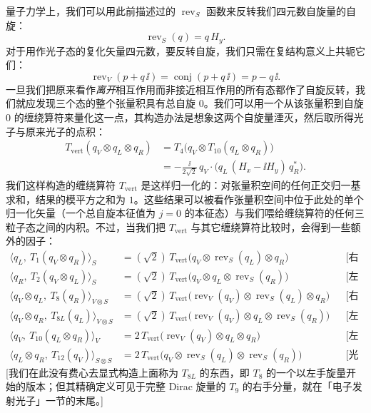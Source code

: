 量子力学上，我们可以用此前描述过的 $\operatorname{rev}_S$ 函数来反转我们四元数自旋量的自旋：
\begin{equation*}
\operatorname{rev}_S(q)=q\,H_y .
\end{equation*}
对于用作光子态的复化矢量四元数，要反转自旋，我们只需在复结构意义上共轭它们：
\begin{equation*}
\operatorname{rev}_V(p+q\,\ii)=\operatorname{conj}(p+q\,\ii)=p-q\,\ii .
\end{equation*}
一旦我们把原来看作\emph{离开}相互作用而非接近相互作用的所有态都作了自旋反转，我们就应发现三个态的整个张量积具有总自旋 $0$。我们可以用一个从该张量积到自旋 0 的缠绕算符来量化这一点，其构造办法是想象这两个自旋量湮灭，然后取所得光子与原来光子的点积：
\begin{align*}
T_{\mathrm{vert}}(q_V\otimes q_L\otimes q_R)
&= T_4\bigl(q_V\otimes T_{10}(q_L\otimes q_R)\bigr)\\
&= -\frac{\ii}{2\sqrt2}\,q_V\cdot\bigl(q_L\,(H_x-\ii H_y)\,q_R^*\bigr).
\end{align*}
我们这样构造的缠绕算符 $T_{\mathrm{vert}}$ 是这样归一化的：对张量积空间的任何正交归一基求和，结果的模平方之和为 $1$。这些结果可以被看作张量积空间中位于此处的单个归一化矢量（一个总自旋本征值为 $j=0$ 的本征态）与我们喂给缠绕算符的任何三粒子态之间的内积。不过，当我们把 $T_{\mathrm{vert}}$ 与其它缠绕算符比较时，会得到一些额外的因子：
\begin{align*}
\langle q_L,\ T_1(q_V\otimes q_R)\rangle_S
&= (\sqrt2)\,T_{\mathrm{vert}}\bigl(q_V\otimes\operatorname{rev}_S(q_L)\otimes q_R\bigr)
&&\text{[右手旋量吸收光子变成左手旋量]}\\
\langle q_R,\ T_2(q_V\otimes q_L)\rangle_S
&= (\sqrt2)\,T_{\mathrm{vert}}\bigl(q_V\otimes q_L\otimes\operatorname{rev}_S(q_R)\bigr)
&&\text{[左手旋量吸收光子变成右手旋量]}\\
\langle q_V\otimes q_L,\ T_8(q_R)\rangle_{V\otimes S}
&= (\sqrt2)\,T_{\mathrm{vert}}\bigl(\operatorname{rev}_V(q_V)\otimes\operatorname{rev}_S(q_L)\otimes q_R\bigr)
&&\text{[右手旋量发射光子变成左手旋量]}\\
\langle q_V\otimes q_R,\ T_{8L}(q_L)\rangle_{V\otimes S}
&= (\sqrt2)\,T_{\mathrm{vert}}\bigl(\operatorname{rev}_V(q_V)\otimes q_L\otimes\operatorname{rev}_S(q_R)\bigr)
&&\text{[左手旋量发射光子变成右手旋量]}\\
\langle q_V,\ T_{10}(q_L\otimes q_R)\rangle_V
&= 2\,T_{\mathrm{vert}}\bigl(\operatorname{rev}_V(q_V)\otimes q_L\otimes q_R\bigr)
&&\text{[左手与右手旋量湮灭产生光子]}\\
\langle q_L\otimes q_R,\ T_{12}(q_V)\rangle_{S\otimes S}
&= 2\,T_{\mathrm{vert}}\bigl(q_V\otimes\operatorname{rev}_S(q_L)\otimes\operatorname{rev}_S(q_R)\bigr)
&&\text{[光子变成一对左手与右手旋量]}
\end{align*}
[我们在此没有费心去显式构造上面称为 $T_{8L}$ 的东西，即 $T_8$ 的一个以左手旋量开始的版本；但其精确定义可见于完整 Dirac 旋量的 $T_9$ 的右手分量，就在「电子发射光子」一节的末尾。]

